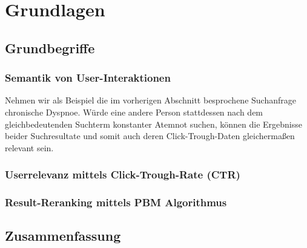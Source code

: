 %
\chapter{Grundlagen}
\label{sec:Grundlagen}

\section{Grundbegriffe}
\label{sec:Grundlagen:Grundbegriffe}

\subsection{Semantik von User-Interaktionen}
\label{sec:Grundlagen:SemantikUserInteraktionen}

Nehmen wir als Beispiel die im vorherigen Abschnitt besprochene Suchanfrage \glqq chronische Dyspnoe\grqq{}. Würde eine andere Person stattdessen nach dem gleichbedeutenden Suchterm \glqq konstanter Atemnot\grqq{} suchen, können die Ergebnisse beider Suchresultate und somit auch deren Click-Trough-Daten gleichermaßen relevant sein. 

\subsection{Userrelevanz mittels Click-Trough-Rate (CTR)}
\label{sec:Grundlagen:UserrelevanzCTR}

\subsection{Result-Reranking mittels PBM Algorithmus}
\label{sec:Grundlagen:Result-RerankingPBM}

\section{Zusammenfassung}
\label{sec:Grundlagen:Zusammenfassung}